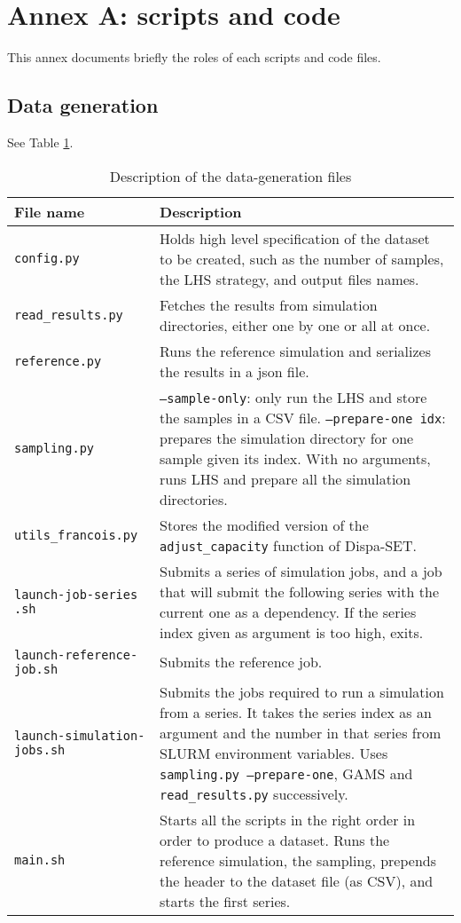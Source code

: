 \addtocounter{section}{1}
\section*{Annex A: scripts and code}

This annex documents briefly the roles of each scripts and code files.

\subsection*{Data generation}

See Table \ref{tab:annex-files-datagen}.

\begin{table}[h]
    \centering
    \begin{tabular}{|p{}|p{}|}
        \hline
        File name & Description \\ \hline
        \texttt{config.py} & Holds high level specification of the dataset to be created, such as the number of samples, the LHS strategy, and output files names. \\
        \texttt{read\_results.py} & Fetches the results from simulation directories, either one by one or all at once. \\
        \texttt{reference.py} & Runs the reference simulation and serializes the results in a json file. \\
        \texttt{sampling.py} & \texttt{--sample-only}: only run the LHS and store the samples in a CSV file. \texttt{--prepare-one idx}: prepares the simulation directory for one sample given its index. With no arguments, runs LHS and prepare all the simulation directories. \\
        \texttt{utils\_francois.py} & Stores the modified version of the \texttt{adjust\_capacity} function of Dispa-SET. \\ \hline
        \texttt{launch-job-series} \texttt{.sh} & Submits a series of simulation jobs, and a job that will submit the following series with the current one as a dependency. If the series index given as argument is too high, exits. \\
        \texttt{launch-reference-} \texttt{job.sh} & Submits the reference job. \\
        \texttt{launch-simulation-} \texttt{jobs.sh} & Submits the jobs required to run a simulation from a series. It takes the series index as an argument and the number in that series from SLURM environment variables. Uses \texttt{sampling.py --prepare-one}, GAMS and \texttt{read\_results.py} successively. \\
        \texttt{main.sh} & Starts all the scripts in the right order in order to produce a dataset. Runs the reference simulation, the sampling, prepends the header to the dataset file (as CSV), and starts the first series. \\ \hline
    \end{tabular}
    \caption{Description of the data-generation files}
    \label{tab:annex-files-datagen}
\end{table}

